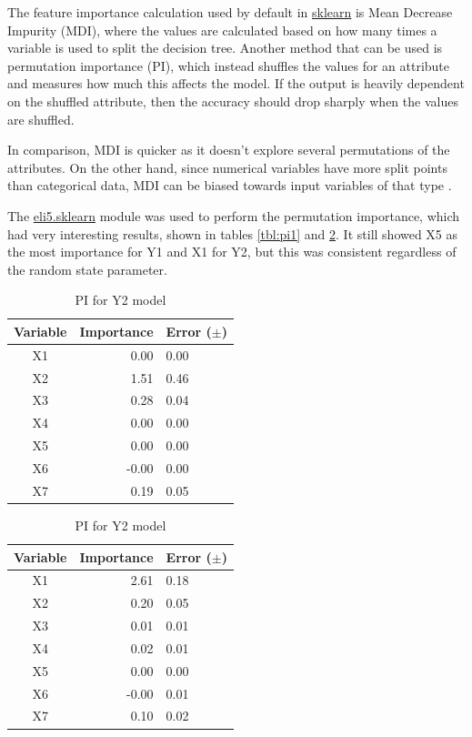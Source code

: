 \documentclass[12pt]{article}
\begin{document}
The feature importance calculation used by default in \url{sklearn} is Mean Decrease Impurity (MDI), where the values are calculated based on how many times a variable is used to split the decision tree. Another method that can be used is permutation importance (PI), which instead shuffles the values for an attribute and measures how much this affects the model. If the output is heavily dependent on the shuffled attribute, then the accuracy should drop sharply when the values are shuffled.

In comparison, MDI is quicker as it doesn't explore several permutations of the attributes. On the other hand, since numerical variables have more split points than categorical data, MDI can be biased towards input variables of that type \cite{aiimportance}.

The \url{eli5.sklearn} module was used to perform the permutation importance, which had very interesting results, shown in tables \ref{tbl:pi1} and \ref{tbl:pi2}. It still showed X5 as the most importance for Y1 and X1 for Y2, but this was consistent regardless of the random state parameter.

\begin{table}[!htb]
    \begin{minipage}{.5\linewidth}
      \caption{PI for Y1 model}   
      \label{tbl:pi1}
      \centering
\begin{tabular}{||c|r|l||}
\hline
Variable    		& Importance & Error ($\pm$) \\
\hline
X1 & 0.00  & 0.00  \\
X2 & 1.51  & 0.46  \\
X3 & 0.28  & 0.04  \\
X4 & 0.00  & 0.00  \\
X5 & 0.00  & 0.00  \\
X6 &-0.00  & 0.00  \\
X7 & 0.19  & 0.05  \\
\hline
\end{tabular}
    \end{minipage}%
    \begin{minipage}{.5\linewidth}
      \centering
        \caption{PI for Y2 model}
              \label{tbl:pi2}
\begin{tabular}{||c|r|l||}
\hline
Variable    		& Importance & Error ($\pm$) \\
\hline
X1                   & 2.61 & 0.18   \\
X2                   & 0.20 & 0.05  \\
X3                   & 0.01 & 0.01 \\
X4                   & 0.02 & 0.01  \\
X5                   & 0.00 & 0.00  \\
X6                   &-0.00 & 0.01  \\
X7                   & 0.10 & 0.02   \\
\hline
\end{tabular}
    \end{minipage} 
\end{table}
\end{document}
